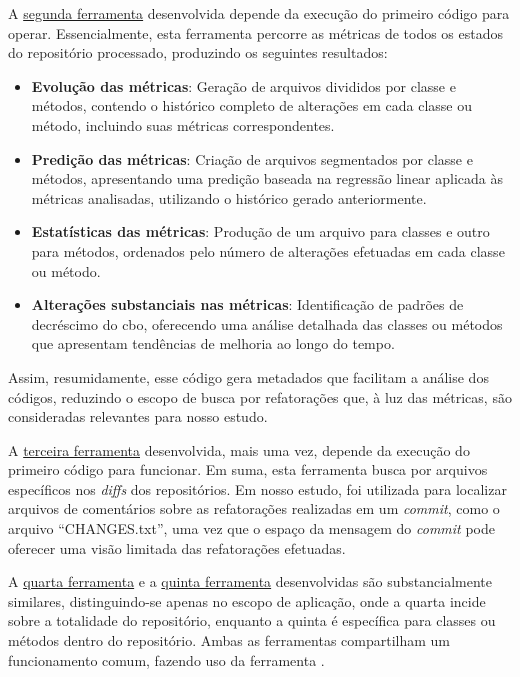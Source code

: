 A \href{https://github.com/BrenoFariasdaSilva/Scientific-Research/blob/main/PyDriller/metrics_changes.py}{segunda ferramenta} desenvolvida depende da execução do primeiro código para operar. Essencialmente, esta ferramenta percorre as métricas de todos os estados do repositório processado, produzindo os seguintes resultados:

\begin{itemize}
    \item \textbf{Evolução das métricas}: Geração de arquivos divididos por classe e métodos, contendo o histórico completo de alterações em cada classe ou método, incluindo suas métricas correspondentes.
    \item \textbf{Predição das métricas}: Criação de arquivos segmentados por classe e métodos, apresentando uma predição baseada na regressão linear aplicada às métricas analisadas, utilizando o histórico gerado anteriormente.
    \item \textbf{Estatísticas das métricas}: Produção de um arquivo para classes e outro para métodos, ordenados pelo número de alterações efetuadas em cada classe ou método.
    \item \textbf{Alterações substanciais nas métricas}: Identificação de padrões de decréscimo do \gls{cbo}, oferecendo uma análise detalhada das classes ou métodos que apresentam tendências de melhoria ao longo do tempo.
\end{itemize}

Assim, resumidamente, esse código gera metadados que facilitam a análise dos códigos, reduzindo o escopo de busca por refatorações que, à luz das métricas, são consideradas relevantes para nosso estudo.

A \href{https://github.com/BrenoFariasdaSilva/Scientific-Research/blob/main/PyDriller/Scripts/track_files.py}{terceira ferramenta} desenvolvida, mais uma vez, depende da execução do primeiro código para funcionar. Em suma, esta ferramenta busca por arquivos específicos nos \textit{diffs} dos repositórios. Em nosso estudo, foi utilizada para localizar arquivos de comentários sobre as refatorações realizadas em um \textit{commit}, como o arquivo ``CHANGES.txt'', uma vez que o espaço da mensagem do \textit{commit} pode oferecer uma visão limitada das refatorações efetuadas.

A \href{https://github.com/BrenoFariasdaSilva/Scientific-Research/blob/main/PyDriller/Scripts/track_files.py}{quarta ferramenta} e a \href{https://github.com/BrenoFariasdaSilva/Scientific-Research/blob/main/RefactoringMiner/metrics_evolution_refactors.py}{quinta ferramenta} desenvolvidas são substancialmente similares, distinguindo-se apenas no escopo de aplicação, onde a quarta  incide sobre a totalidade do repositório, enquanto a quinta é específica para classes ou métodos dentro do repositório. Ambas as ferramentas compartilham um funcionamento comum, fazendo uso da ferramenta \cite{Tsantalis:ICSE:2018:RefactoringMiner}.

